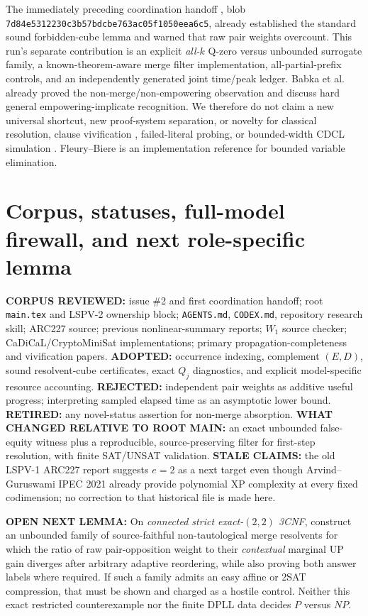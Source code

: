 \documentclass[10pt]{article}
\begin{document}
The immediately preceding coordination handoff , blob \texttt{7d84e5312230c3b57bdcbe763ac05f1050eea6c5}, already established the standard sound forbidden-cube lemma and warned that raw pair weights overcount. This run's separate contribution is an explicit \emph{all-$k$} Q-zero versus unbounded surrogate family, a known-theorem-aware merge filter implementation, all-partial-prefix controls, and an independently generated joint time/peak ledger. Babka et al. \cite{Babka2013} already proved the non-merge/non-empowering observation and discuss hard general empowering-implicate recognition. We therefore do not claim a new universal shortcut, new proof-system separation, or novelty for classical resolution, clause vivification \cite{Li2020}, failed-literal probing, or bounded-width CDCL simulation \cite{Atserias2011}. Fleury--Biere \cite{Fleury2023} is an implementation reference for bounded variable elimination.

\section{Corpus, statuses, full-model firewall, and next role-specific lemma}
\noindent\textbf{CORPUS REVIEWED:} issue \#2 and first coordination handoff; root \texttt{main.tex} and LSPV-2 ownership block; \texttt{AGENTS.md}, \texttt{CODEX.md}, repository research skill; ARC227 source; previous nonlinear-summary reports; $W_1$ source checker; CaDiCaL/CryptoMiniSat implementations; primary propagation-completeness and vivification papers. \textbf{ADOPTED:} occurrence indexing, complement $(E,D)$, sound resolvent-cube certificates, exact $Q_j$ diagnostics, and explicit model-specific resource accounting. \textbf{REJECTED:} independent pair weights as additive useful progress; interpreting sampled elapsed time as an asymptotic lower bound. \textbf{RETIRED:} any novel-status assertion for non-merge absorption. \textbf{WHAT CHANGED RELATIVE TO ROOT MAIN:} an exact unbounded false-equity witness plus a reproducible, source-preserving filter for first-step resolution, with finite SAT/UNSAT validation. \textbf{STALE CLAIMS:} the old LSPV-1 ARC227 report suggests $e=2$ as a next target even though Arvind--Guruswami IPEC 2021 already provide polynomial XP complexity at every fixed codimension; no correction to that historical file is made here.

\noindent\textbf{OPEN NEXT LEMMA:} On \emph{connected strict exact-$(2,2)$ 3CNF}, construct an unbounded family of source-faithful non-tautological merge resolvents for which the ratio of raw pair-opposition weight to their \emph{contextual} marginal UP gain diverges after arbitrary adaptive reordering, while also proving both answer labels where required. If such a family admits an easy affine or 2SAT compression, that must be shown and charged as a hostile control. Neither this exact restricted counterexample nor the finite DPLL data decides $P$ versus $NP$.



\end{document}
